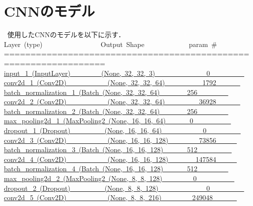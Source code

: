 \documentclass[twocolumn]{ujarticle}     %
\begin{document}
\section{CNNのモデル}
\ 使用したCNNのモデルを以下に示す．\\
Layer\ (type)\ \ \ \ \ \ \ \ \ \ \ \ \ \ \ \ \ Output\ Shape\ \ \ \ \ \ \ \ \ \ \ \ \ param\ \#
=================================================================
\underline{input\_1\ (InputLayer)\ \ \ \ \ \ \ \ \ (None,\ 32,\ 32,\ 3)\ \ \ \ \ \ \ \ \ \ \ \ \ \ \ 0\ \ \ \ \ \ \ \ \ \ }
\\  
\underline{conv2d\_1\ (Conv2D)\ \ \ \ \ \ \ \ \ \ \ \ (None,\ 32,\ 32,\ 64)\ \ \ \ \ \ \ \ \ \ \ 1792\ \ \ \ \ \ \ }      
\\  
\underline{batch\_normalization\_1\ (Batch\ (None,\ 32,\ 32,\ 64)\ \ \ \ \ \ \ \ 256\ \ \ \ \ \ \ \ \ }
\\  
\underline{conv2d\_2\ (Conv2D)\ \ \ \ \ \ \ \ \ \ \ \ (None,\ 32,\ 32,\ 64)\ \ \ \ \ \ \ \ \ \ 36928\ \ \ \ \ \ \ }
\\  
\underline{batch\_normalization\_2\ (Batch\ (None,\ 32,\ 32,\ 64)\ \ \ \ \ \ \ \ 256\ \ \ \ \ \ \ \ \ }
\\  
\underline{max\_pooling2d\_1\ (MaxPooling2\ (None,\ 16,\ 16,\ 64)\ \ \ \ \ \ \ 0\ \ \ \ \ \ \ \ \ \ \ }
\\  
\underline{dropout\_1\ (Dropout)\ \ \ \ \ \ \ \ \ \ (None,\ 16,\ 16,\ 64)\ \ \ \ \ \ \ \ \ \ \ \ 0\ \ \ \ \ \ \ \ \ \ }
\\  
\underline{conv2d\_3\ (Conv2D)\ \ \ \ \ \ \ \ \ \ \ \ (None,\ 16,\ 16,\ 128)\ \ \ \ \ \ \ \ \ 73856\ \ \ \ \ \ }
\\  
\underline{batch\_normalization\_3\ (Batch\ (None,\ 16,\ 16,\ 128)\ \ \ \ \ \ \ 512\ \ \ \ \ \ \ \ \ \ }
\\  
\underline{conv2d\_4\ (Conv2D)\ \ \ \ \ \ \ \ \ \ \ \ (None,\ 16,\ 16,\ 128)\ \ \ \ \ \ \ \ 147584\ \ \ \ \ \ }
\\  
\underline{batch\_normalization\_4\ (Batch\ (None,\ 16,\ 16,\ 128)\ \ \ \ \ \ \ 512\ \ \ \ \ \ \ \ \ }
\\  
\underline{max\_pooling2d\_2\ (MaxPooling2\ (None,\ 8,\ 8,\ 128)\ \ \ \ \ \ \ \ \ 0\ \ \ \ \ \ \ \ \ \ \ }
\\  
\underline{dropout\_2\ (Dropout)\ \ \ \ \ \ \ \ \ \ (None,\ 8,\ 8,\ 128)\ \ \ \ \ \ \ \ \ \ \ \ \ \ 0\ \ \ \ \ \ \ \ \ \ }
\\  
\underline{conv2d\_5\ (Conv2D)\ \ \ \ \ \ \ \ \ \ \ \ (None,\ 8,\ 8,\ 216)\ \ \ \ \ \ \ \ \ 249048\ \ \ \ \ \ \ }
\\  
\end{document}
